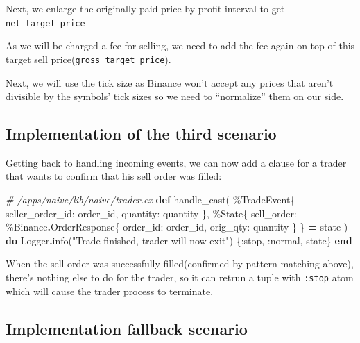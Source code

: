 \documentclass[
]{book}
\newenvironment{Shaded}{\begin{snugshade}}{\end{snugshade}}
\newcommand{\CommentTok}[1]{\textcolor[rgb]{0.56,0.35,0.01}{\textit{#1}}}
\newcommand{\ConstantTok}[1]{\textcolor[rgb]{0.00,0.00,0.00}{#1}}
\newcommand{\KeywordTok}[1]{\textcolor[rgb]{0.13,0.29,0.53}{\textbf{#1}}}
\newcommand{\NormalTok}[1]{#1}
\newcommand{\OperatorTok}[1]{\textcolor[rgb]{0.81,0.36,0.00}{\textbf{#1}}}
\newcommand{\StringTok}[1]{\textcolor[rgb]{0.31,0.60,0.02}{#1}}
\newcommand{\VariableTok}[1]{\textcolor[rgb]{0.00,0.00,0.00}{#1}}
\begin{document}
Next, we enlarge the originally paid price by profit interval to get \texttt{net\_target\_price}

As we will be charged a fee for selling, we need to add the fee again on top of this target sell price(\texttt{gross\_target\_price}).

Next, we will use the tick size as Binance won't accept any prices that aren't divisible by the symbols' tick sizes so we need to ``normalize'' them on our side.

\hypertarget{implementation-of-the-third-scenario}{%
\subsection{Implementation of the third scenario}\label{implementation-of-the-third-scenario}}

Getting back to handling incoming events, we can now add a clause for a trader that wants to confirm that his sell order was filled:

\begin{Shaded}
\begin{Highlighting}[]
  \CommentTok{\# /apps/naive/lib/naive/trader.ex}
  \KeywordTok{def}\NormalTok{ handle\_cast(}
\NormalTok{        \%}\ConstantTok{TradeEvent}\NormalTok{\{}
          \VariableTok{seller\_order\_id:}\NormalTok{ order\_id,}
          \VariableTok{quantity:}\NormalTok{ quantity}
\NormalTok{        \},}
\NormalTok{        \%}\ConstantTok{State}\NormalTok{\{}
          \VariableTok{sell\_order:}\NormalTok{ \%}\ConstantTok{Binance}\OperatorTok{.}\ConstantTok{OrderResponse}\NormalTok{\{}
            \VariableTok{order\_id:}\NormalTok{ order\_id,}
            \VariableTok{orig\_qty:}\NormalTok{ quantity}
\NormalTok{          \}}
\NormalTok{        \} }\OperatorTok{=}\NormalTok{ state}
\NormalTok{      ) }\KeywordTok{do}
    \ConstantTok{Logger}\OperatorTok{.}\NormalTok{info(}\StringTok{"Trade finished, trader will now exit"}\NormalTok{)}
\NormalTok{    \{}\VariableTok{:stop}\NormalTok{, }\VariableTok{:normal}\NormalTok{, state\}}
  \KeywordTok{end}
\end{Highlighting}
\end{Shaded}

When the sell order was successfully filled(confirmed by pattern matching above), there's nothing else to do for the trader, so it can retrun a tuple with \texttt{:stop} atom which will cause the trader process to terminate.

\hypertarget{implementation-fallback-scenario}{%
\subsection{Implementation fallback scenario}\label{implementation-fallback-scenario}}
\end{document}
